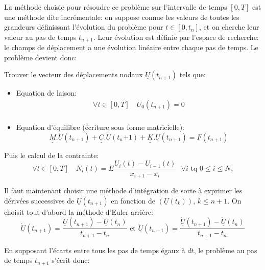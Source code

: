 \documentclass[fleqn]{article}
\begin{document}
La méthode choisie pour résoudre ce problème sur l'intervalle de temps $\left[0,T\right]$ est une méthode dite incrémentale: on suppose connue les valeurs de toutes les grandeurs définissant l'évolution du problème pour $t \in \left[0,t_n\right]$, et on cherche leur valeur au pas de temps $t_{n+1}$. Leur évolution est définie par l'espace de recherche: le champs de déplacement a une évolution linéaire entre chaque pas de temps. Le problème devient donc:

\begin{it} 
	Trouver le vecteur des déplacements nodaux $\underline{U}(t_{n+1})$ tels que:
\end{it}
\begin{itemize}
	\item Equation de laison:
		\begin{equation*}
			\begin{array}{l}
				\forall t \in \left[0,T\right] \quad U_0(t_{n+1})=0\\
			\end{array}
		\end{equation*}
	\item Equation d'équilibre (écriture sous forme matricielle):
		\begin{equation*}
			\underline{\underline{M}}.\underline{\ddot{U}}(t_{n+1}) + \underline{\underline{C}}.\underline{\dot{U}}(t_n{+1}) + \underline{\underline{K}}.\underline{U}(t_{n+1}) = \underline{F}(t_{n+1})
		\end{equation*}
\end{itemize}

Puis le calcul de la contrainte:
		\begin{equation*}
			\forall t \in \left[ 0,T \right] \quad  N_i(t) = E \frac{U_{i}(t)-U_{i-1}(t)}{x_{i+1}-x_i} \mbox{ } \forall i \mbox{ tq } 0\leq i\leq N_e
		\end{equation*}

Il faut maintenant choisir une méthode d'intégration de sorte à exprimer les dérivées successives de $\underline{U}(t_{n+1})$ en fonction de $(\underline{U}(t_k))$, $k\leq n+1$. On choisit tout d'abord la méthode d'Euler arrière:
\begin{equation*}
	\underline{\dot{U}}(t_{n+1}) = \frac{\underline{U}(t_{n+1})-\underline{U}(t_n)}{t_{n+1}-t_n} \mbox{ et } \underline{\ddot{U}}(t_{n+1}) = \frac{\underline{\dot{U}}(t_{n+1})-\underline{\dot{U}}(t_n)}{t_{n+1}-t_n}
\end{equation*}

En supposant l'écarts entre tous les pas de temps égaux à $dt$, le problème au pas de temps $t_{n+1}$ s'écrit donc:
\end{document}

